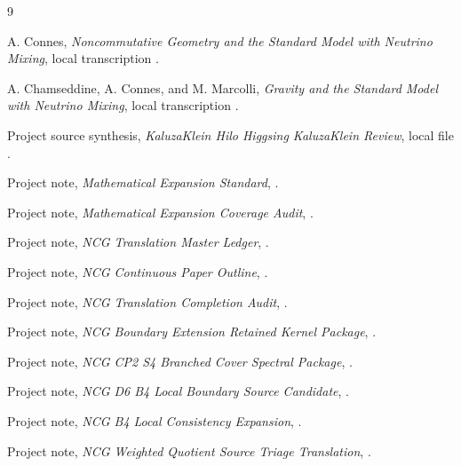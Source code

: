 \documentclass[11pt]{article}
\begin{document}
\begin{thebibliography}{9}
\raggedright

A. Connes, \emph{Noncommutative Geometry and the Standard Model with
Neutrino Mixing}, local transcription
.

A. Chamseddine, A. Connes, and M. Marcolli, \emph{Gravity and the Standard
Model with Neutrino Mixing}, local transcription
.

Project source synthesis, \emph{KaluzaKlein Hilo Higgsing KaluzaKlein
Review}, local file
.

Project note, \emph{Mathematical Expansion Standard},
.

Project note, \emph{Mathematical Expansion Coverage Audit},
.

Project note, \emph{NCG Translation Master Ledger},
.

Project note, \emph{NCG Continuous Paper Outline},
.

Project note, \emph{NCG Translation Completion Audit},
.

Project note, \emph{NCG Boundary Extension Retained Kernel Package},
.

Project note, \emph{NCG CP2 S4 Branched Cover Spectral Package},
.

Project note, \emph{NCG D6 B4 Local Boundary Source Candidate},
.

Project note, \emph{NCG B4 Local Consistency Expansion},
.

Project note, \emph{NCG Weighted Quotient Source Triage Translation},
.


\end{thebibliography}
\end{document}
